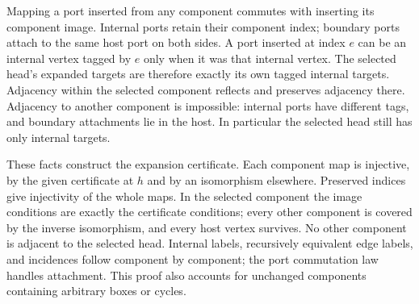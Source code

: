 






Mapping a port inserted from any component commutes with inserting its
component image. Internal ports retain their component index; boundary ports
attach to the same host port on both sides. A port inserted at index $e$ can
be an internal vertex tagged by $e$ only when it was that internal vertex.
The selected head's expanded targets are therefore exactly its own tagged
internal targets. Adjacency within the selected component reflects and
preserves adjacency there. Adjacency to another component is impossible:
internal ports have different tags, and boundary attachments lie in the host.
In particular the selected head still has only internal targets.







These facts construct the expansion certificate. Each component map is
injective, by the given certificate at $h$ and by an isomorphism elsewhere.
Preserved indices give injectivity of the whole maps. In the selected component
the image conditions are exactly the certificate conditions; every other
component is covered by the inverse isomorphism, and every host vertex survives.
No other component is adjacent to the selected head. Internal labels, recursively
equivalent edge labels, and incidences follow component by component; the port
commutation law handles attachment. This proof also accounts for unchanged
components containing arbitrary boxes or cycles.

